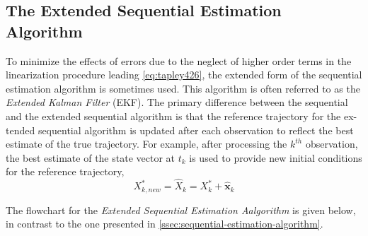 \subsection{The Extended Sequential Estimation Algorithm}
To minimize the effects of errors due to the neglect of higher order terms in the
linearization procedure leading \ref{eq:tapley426}, the extended form of the sequential
estimation algorithm is sometimes used. This algorithm is often referred to as the
\emph{Extended Kalman Filter} (EKF). The primary difference between the sequential
and the extended sequential algorithm is that the reference trajectory for the ex-
tended sequential algorithm is updated after each observation to reflect the best
estimate of the true trajectory. For example, after processing the \(k^{th}\) observation,
the best estimate of the state vector at \(t_k\) is used to provide new initial
conditions for the reference trajectory,
\begin{equation}
	X^*_{k,new} = \hat{X}_k = X^*_k + \hat{\bm{x}}_k
\end{equation}

The flowchart for the \emph{Extended Sequential Estimation Aalgorithm} is given below,
in contrast to the one presented in \ref{ssec:sequential-estimation-algorithm}.

